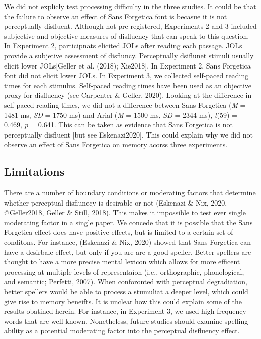 \documentclass[english,doc]{apa6}
\begin{document}
We did not explicly test processing difficulty in the three studies. It could be that the failure to observe an effect of Sans Forgetica font is becasue it is not perceptually disfluent. Although not pre-registered, Experiments 2 and 3 included subjective and objective measures of disfluency that can speak to this question. In Experiment 2, participnats elicited JOLs after reading each passage. JOLs provide a subjetive assessment of disfluncy. Perceptually dsiflunet stimuli usually elicit lower JOLs{[}Geller et al. (2018); Xie2018{]}. In Experiment 2, Sans Forgetica font did not elicit lower JOLs. In Experiment 3, we collected self-paced reading times for each stimulus. Self-paced reading times have been used as an objective proxy for disfluency (see Carpenter \& Geller, 2020). Looking at the difference in self-paced reading times, we did not a difference between Sans Forgetica (\emph{M} = 1481 ms, \emph{SD} = 1750 ms) and Arial (\emph{M} = 1500 ms, \emph{SD} = 2344 ms), \emph{t}(59) = 0.469, \emph{p} = 0.641. This can be taken as evidence that Sans Forgetica is not perceptually disfluent {[}but see Eskenazi2020{]}. This could explain why we did not observe an effect of Sans Forgetica on memory acorss three experiments.

\hypertarget{limitations}{%
\subsection{Limitations}\label{limitations}}

There are a number of boundary conditions or moderating factors that determine whether perceptual disflunecy is desirable or not (Eskenazi \& Nix, 2020, @Geller2018, Geller \& Still, 2018). This makes it impossible to test ever single moderating factor in a single paper. We concede that it is possible that the Sans Forgetica effect does have positive effects, but is limited to a certain set of conditons. For instance, (Eskenazi \& Nix, 2020) showed that Sans Forgetica can have a desirbale effect, but only if you are are a good speller. Better spellers are thought to have a more precise mental lexicon which allows for more efficent processing at multiple levels of representaion (i.e,, orthographic, phonological, and semantic; Perfetti, 2007). When conforonted with perceptual degradiation, better spellers would be able to process a stumuliat a deeper level, which could give rise to memory beneifts. It is unclear how this could explain some of the results obatined herein. For instance, in Experiment 3, we used high-frequency words that are well known. Nonetheless, future studies should examine spelling ability as a potential moderating factor into the perceptual disfluency effect.
\end{document}
